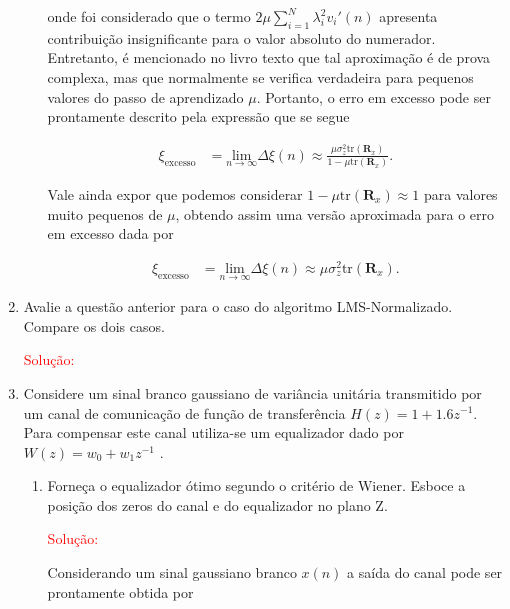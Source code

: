 \documentclass[a4paper,10pt]{article}
\begin{document}
\begin{enumerate}
\begin{enumerate}
						onde foi considerado que o termo $2 \mu \sum^{N}_{i = 1} \lambda^{2}_{i} v_{i}'(n)$ apresenta contribuição insignificante para o valor absoluto do numerador. Entretanto, é mencionado no livro texto que tal aproximação é de prova complexa, mas que normalmente 
						se verifica verdadeira para pequenos valores do passo de aprendizado $\mu$. Portanto, o erro em excesso pode ser prontamente descrito pela expressão que se segue

						\begin{align}
							\xi_{\text{excesso}} &= \underset{n \rightarrow \infty}{\text{lim}} \Delta \xi(n) \approx \frac{\mu \sigma^{2}_{z} \text{tr}(\mathbf{R}_{x})}{1 - \mu \text{tr}(\mathbf{R}_{x})}.
						\end{align}

						Vale ainda expor que podemos considerar $1 - \mu \text{tr}(\mathbf{R}_{x}) \approx 1$ para valores muito pequenos de $\mu$, obtendo assim uma versão aproximada para o erro em excesso dada por
						
						\begin{align}
							\xi_{\text{excesso}} &= \underset{n \rightarrow \infty}{\text{lim}} \Delta \xi(n) \approx \mu \sigma^{2}_{z} \text{tr}(\mathbf{R}_{x}).
						\end{align}

				\end{enumerate}

			\item Avalie a questão anterior para o caso do algoritmo LMS-Normalizado. Compare os dois casos.
				
			\textcolor{red}{Solução:}
						
			\item Considere um sinal branco gaussiano de variância unitária transmitido por um canal de comunicação de função de transferência $H(z) = 1 + 1.6z^{-1}$. Para compensar este
			canal utiliza-se um equalizador dado por $W(z) = w_{0} + w_{1}z^{-1}$ .
			
			
				\begin{enumerate}
					
					\item Forneça o equalizador ótimo segundo o critério de Wiener. Esboce a posição dos zeros do canal e do equalizador no plano Z.
					
						\textcolor{red}{Solução:}
						
						Considerando um sinal gaussiano branco $x(n)$ a saída do canal pode ser prontamente obtida por
						

\end{enumerate}
\end{enumerate}
\end{document}
